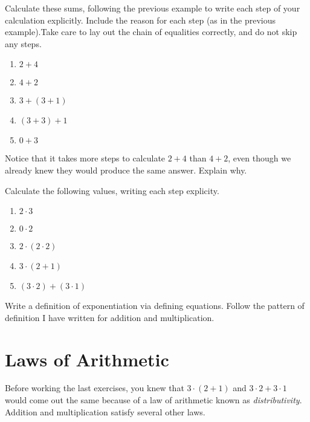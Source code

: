 \begin{exercises}
\item Calculate these sums, following the previous example to write
  each step of your calculation explicitly. Include the reason for
  each step (as in the previous example).Take care to lay out the
  chain of equalities correctly, and do not skip any steps.
\begin{enumerate}
\item $2+4$
\item $4+2$
\item $3+(3+1)$
\item $(3+3)+1$
\item $0 + 3$
\end{enumerate}

\item Notice that it takes more steps to calculate $2+4$ than $4+2$, even though we already knew
they would produce the same answer. Explain why.

\item Calculate the following values, writing each step explicity. 
 \begin{enumerate}
    \item $2\cdot 3$
    \item $0\cdot 2$
    \item $2\cdot(2\cdot 2)$
    \item $3\cdot(2 + 1)$
    \item $(3\cdot 2) + (3\cdot 1)$
    \end{enumerate}
\item Write a definition of exponentiation via defining equations. Follow the pattern
of definition I have written for addition and multiplication.
\end{exercises}

\chapter{Laws of Arithmetic}

Before working the last exercises, you knew that $3\cdot (2+1)$ and $3\cdot 2+ 3\cdot 1$
would come out the same because of a law of arithmetic known as \emph{distributivity}. 
Addition and multiplication satisfy several other laws.

